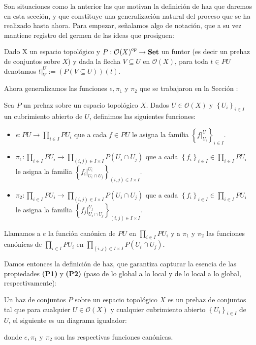 Son situaciones como la anterior las que motivan la definición de haz que daremos en esta sección, y que constituye una generalización natural del proceso que se ha realizado hasta ahora. Para empezar, señalamos algo de notación, que a su vez mantiene registro del germen de las ideas que prosiguen:
\begin{Not}
Dado X un espacio topológico y ${P:\mathcal{O}(X)}^{op}\to\normalfont{\textbf{Set}}$ un funtor (es decir un prehaz de conjuntos sobre $X$) y dada la flecha $V\subseteq U$ en $\mathcal{O}(X)$, para toda $t\in PU$ denotamos $t|^{U}_{V}:=(P(V\subseteq U))(t)$.
\end{Not}
Ahora generalizamos las funciones $e,\pi_1$ y $\pi_2$ que se trabajaron en la Sección :
\begin{Def}
   Sea $P$ un prehaz sobre un espacio topológico $X$. Dados $U\in\mathcal{O}(X)$ y $\left\lbrace U_i\right\rbrace_{i\in I}$ un cubrimiento abierto de $U$, definimos las siguientes funciones:
   \begin{itemize}
      \item $e:PU\to \prod_{i\in I}PU_i$ que a cada $f\in PU$ le asigna la familia $\left\lbrace f|^{U}_{U_i}\right\rbrace_{i\in I}$.
      \item $\pi_1:\prod_{i\in I}PU_i\to \prod_{(i,j)\in I\times I}P(U_i\cap U_j)$ que a cada $\left\lbrace f_i\right\rbrace_{i\in I}\in\prod_{i\in I}PU_i$ le asigna la familia $\left\lbrace {f_i}|^{U_i}_{U_i\cap U_j}\right\rbrace_{(i,j)\in I\times I}$.
      \item $\pi_2:\prod_{i\in I}PU_i\to \prod_{(i,j)\in I\times I}P(U_i\cap U_j)$ que a cada $\left\lbrace f_i\right\rbrace_{i\in I}\in\prod_{i\in I}PU_i$ le asigna la familia $\left\lbrace {f_j}|^{U_j}_{U_i\cap U_j}\right\rbrace_{(i,j)\in I\times I}$.
   \end{itemize}
   Llamamos a $e$ la función canónica de $PU$ en $\prod_{i\in I}PU_i$ y a $\pi_1$ y $\pi_2$ las funciones canónicas de $\prod_{i\in I}PU_i$ en $\prod_{(i,j)\in I\times I}P(U_i\cap U_j)$.
\end{Def}
Damos entonces la definición de haz, que garantiza capturar la esencia de las propiedades \textbf{(P1)} y \textbf{(P2)} (paso de lo global a lo local y de lo local a lo global, respectivamente):
\begin{Def}
   Un haz de conjuntos $P$ sobre un espacio topológico $X$ es un prehaz de conjuntos tal que para cualquier $U\in \mathcal{O}(X)$ y cualquier cubrimiento abierto $\left\lbrace U_i\right\rbrace_{i\in I}$ de $U$, el siguiente es un diagrama igualador:
   
   donde $e,\pi_1$ y $\pi_2$ son las respectivas funciones canónicas.
\end{Def}
